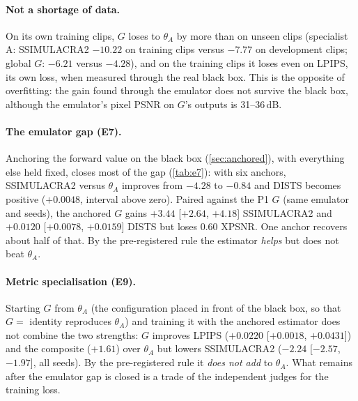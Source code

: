 \paragraph{Not a shortage of data.}
On its own training clips, $G$ loses to $\theta_A$ by more than on unseen clips (specialist A:
SSIMULACRA2 $-10.22$ on training clips versus $-7.77$ on development clips; global $G$: $-6.21$
versus $-4.28$), and on the training clips it loses even on LPIPS, its own loss, when measured
through the real black box. This is the opposite of overfitting: the gain found through the emulator
does not survive the black box, although the emulator's pixel PSNR on $G$'s outputs is 31--36\,dB.

\paragraph{The emulator gap (E7).}
Anchoring the forward value on the black box (\cref{sec:anchored}), with everything else held fixed,
closes most of the gap (\cref{tab:e7}): with six anchors, SSIMULACRA2 versus $\theta_A$ improves from
$-4.28$ to $-0.84$ and DISTS becomes positive ($+0.0048$, interval above zero). Paired against the
P1 $G$ (same emulator and seeds), the anchored $G$ gains $+3.44$ [$+2.64$, $+4.18$] SSIMULACRA2 and
$+0.0120$ [$+0.0078$, $+0.0159$] DISTS but loses $0.60$ XPSNR. One anchor recovers about half of
that. By the pre-registered rule the estimator \emph{helps} but does not beat $\theta_A$.

\paragraph{Metric specialisation (E9).}
Starting $G$ from $\theta_A$ (the configuration placed in front of the black box, so that $G=$
identity reproduces $\theta_A$) and training it with the anchored estimator does not combine the two
strengths: $G$ improves LPIPS ($+0.0220$ [$+0.0018$, $+0.0431$]) and the composite ($+1.61$) over
$\theta_A$ but lowers SSIMULACRA2 ($-2.24$ [$-2.57$, $-1.97$], all seeds). By the pre-registered rule
it \emph{does not add} to $\theta_A$. What remains after the emulator gap is closed is a trade of
the independent judges for the training loss.

